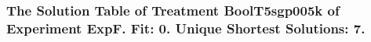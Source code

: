  \begin{frame}
 \fontsize{8pt}{9pt}\selectfont
 \frametitle{ The Solution Table of Treatment BoolT5sgp005k of Experiment ExpF. Fit: 0. Unique Shortest Solutions: 7. }

 \label{ExpFSolutionTable003.tex}  
 \end{frame}

